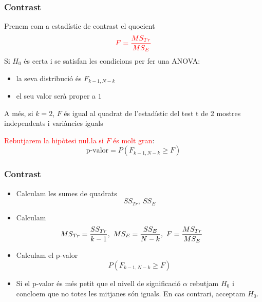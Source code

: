 \documentclass[12pt,t]{beamer}
\newcommand{\red}[1]{\textcolor{red}{#1}}
\renewcommand{\emph}[1]{{\color{red}#1}}
\renewcommand{\geq}{\geqslant}
\theoremstyle{plain}
\theoremstyle{definition}
\begin{document}
\begin{frame}
\frametitle{Contrast}

Prenem com a \emph{estadístic de contrast} el quocient 
$$
\red{F=\frac{MS_{Tr}}{MS_E}}
$$
Si $H_0$ és certa i se satisfan les condicions per fer una ANOVA:
\begin{itemize}
\item la seva distribució és $F_{k-1,N-k}$

\smallskip

\item el seu valor serà proper a $1$
\end{itemize}\medskip

A més, si $k=2$, $F$ és igual al quadrat de l'estadístic del test t de 2 mostres independents i variàncies iguals\pause\medskip

\red{Rebutjarem la hipòtesi nu\l.la si $F$ és molt gran}:
$$
\text{p-valor}=P(F_{k-1,N-k}\geq F)
$$



\end{frame}

\begin{frame}
\frametitle{Contrast}

\begin{itemize}
\item Calculam les sumes de quadrats 
$$
SS_{Tr},\ SS_E
$$

\item Calculam 
$$
\hspace*{-5ex} MS_{Tr}=\frac{SS_{Tr}}{k-1},\
MS_E=\frac{SS_E}{N-k},\ F=\frac{MS_{Tr}}{MS_E}
$$

\item Calculam el p-valor
$$
P(F_{k-1,N-k}\geq F)
$$

\item Si el p-valor és més petit que el nivell de significació $\alpha$  rebutjam $H_0$ i concloem que no totes les mitjanes són iguals. En cas contrari, acceptam $H_0$.
\end{itemize}
\end{frame}
\end{document}
